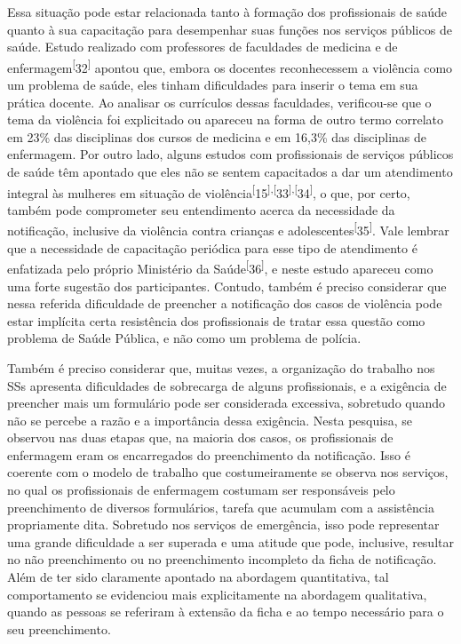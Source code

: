 \documentclass{article}
\begin{document}
Essa situação pode estar relacionada tanto à formação dos profissionais de saúde
quanto à sua capacitação para desempenhar suas funções nos serviços públicos de
saúde. Estudo realizado com professores de faculdades de medicina e de
enfermagem\textsuperscript{[}32\textsuperscript{]}
apontou que, embora os docentes reconhecessem a violência como um problema de
saúde, eles tinham dificuldades para inserir o tema em sua prática docente. Ao
analisar os currículos dessas faculdades, verificou-se que o tema da violência
foi explicitado ou apareceu na forma de outro termo correlato em 23\% das
disciplinas dos cursos de medicina e em 16,3\% das disciplinas de enfermagem.
Por outro lado, alguns estudos com profissionais de serviços públicos de saúde
têm apontado que eles não se sentem capacitados a dar um atendimento integral às
mulheres em situação de violência\textsuperscript{[}15\textsuperscript{]}\textsuperscript{,}\textsuperscript{[}33\textsuperscript{]}\textsuperscript{,}\textsuperscript{[}34\textsuperscript{]}, o que, por certo, também pode comprometer seu entendimento acerca da
necessidade da notificação, inclusive da violência contra crianças e
adolescentes\textsuperscript{[}35\textsuperscript{]}. Vale lembrar que a necessidade de capacitação periódica para esse tipo de
atendimento é enfatizada pelo próprio Ministério da
Saúde\textsuperscript{[}36\textsuperscript{]}, e neste estudo apareceu como uma forte sugestão dos participantes. Contudo,
também é preciso considerar que nessa referida dificuldade de preencher a
notificação dos casos de violência pode estar implícita certa resistência dos
profissionais de tratar essa questão como problema de Saúde Pública, e não como
um problema de polícia.

Também é preciso considerar que, muitas vezes, a organização do trabalho nos SSs
apresenta dificuldades de sobrecarga de alguns profissionais, e a exigência de
preencher mais um formulário pode ser considerada excessiva, sobretudo quando
não se percebe a razão e a importância dessa exigência. Nesta pesquisa, se
observou nas duas etapas que, na maioria dos casos, os profissionais de
enfermagem eram os encarregados do preenchimento da notificação. Isso é coerente
com o modelo de trabalho que costumeiramente se observa nos serviços, no qual os
profissionais de enfermagem costumam ser responsáveis pelo preenchimento de
diversos formulários, tarefa que acumulam com a assistência propriamente dita.
Sobretudo nos serviços de emergência, isso pode representar uma grande
dificuldade a ser superada e uma atitude que pode, inclusive, resultar no não
preenchimento ou no preenchimento incompleto da ficha de notificação. Além de
ter sido claramente apontado na abordagem quantitativa, tal comportamento se
evidenciou mais explicitamente na abordagem qualitativa, quando as pessoas se
referiram à extensão da ficha e ao tempo necessário para o seu preenchimento.
\end{document}
